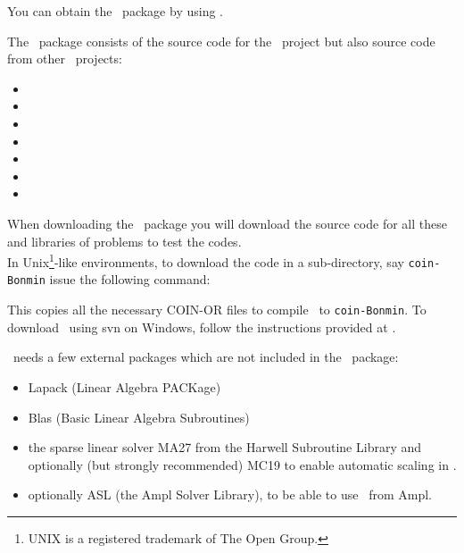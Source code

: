 \StartPageSummary
{}
\EndPageSummary
\NavigationPanel





You can obtain the \Bonmin\ package by using
.

The \Bonmin\ package consists of the source code for the \Bonmin\
project but also source code from other \COINOR\ projects:
\begin{itemize}
\item \BuildTools
\item \Cbc
\item \Cgl
\item \Clp
\item \CoinUtils
\item \Ipopt
\item \Osi
\end{itemize}

When downloading the \Bonmin\ package you will download the source code for all these and
libraries of problems to test the codes.\\

In Unix\footnote{UNIX is a registered trademark of The Open
Group.}-like environments, to download the code in a sub-directory, say {\tt coin-Bonmin} issue the following
command:
\break


This copies all the necessary COIN-OR files to compile \Bonmin\ to
{\tt coin-Bonmin}. To download \Bonmin\ using svn on Windows,
follow the instructions provided at
.

\Bonmin\ needs a few external packages which are not included in the \Bonmin\ package:
\begin{itemize}
\item Lapack (Linear Algebra PACKage)
\item Blas (Basic Linear Algebra Subroutines)
\item the sparse linear solver MA27 from the Harwell Subroutine Library and optionally (but strongly recommended) MC19 to enable automatic scaling in \Ipopt.
\item optionally ASL (the Ampl Solver Library), to be able to use \Bonmin\ from Ampl.
\end{itemize}

